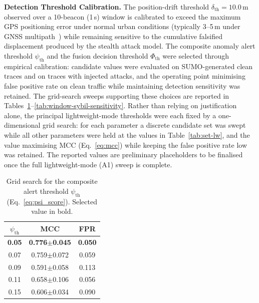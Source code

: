 \documentclass[12pt, a4paper]{report}
\begin{document}
\textbf{Detection Threshold Calibration.}
The position-drift threshold $\delta_{\mathrm{th}} = 10.0$\,m
observed over a 10-beacon (1\,s) window is calibrated to exceed
the maximum GPS positioning error under normal urban conditions
(typically 3--5\,m under GNSS multipath~\cite{kenney2011dedicated})
while remaining sensitive to the cumulative falsified displacement
produced by the stealth attack model. The composite anomaly alert
threshold $\psi_{\mathrm{th}}$ and the fusion decision threshold
$\Phi_{\mathrm{th}}$ were selected through empirical calibration:
candidate values were evaluated on SUMO-generated clean traces and
on traces with injected attacks, and the operating point minimising
false positive rate on clean traffic while maintaining detection
sensitivity was retained. The grid-search sweeps supporting these choices are reported in
Tables~\ref{tab:threshold-sensitivity}--\ref{tab:window-sybil-sensitivity}.
Rather than relying on justification alone, the principal lightweight-mode
thresholds were each fixed by a one-dimensional grid search: for each
parameter a discrete candidate set was swept while all other parameters
were held at the values in Table~\ref{tab:set-lw}, and the value maximising MCC (Eq.~\ref{eq:mcc}) while keeping the false positive rate low was retained. The reported values are preliminary placeholders to be
finalised once the full lightweight-mode (A1) sweep is complete.

\begin{table}[H]
\centering
\caption{Grid search for the composite alert threshold $\psi_{\mathrm{th}}$
(Eq.~\ref{eq:psi_score}). Selected value in bold.}
\label{tab:threshold-sensitivity}
\renewcommand{\arraystretch}{1.2}
\begin{tabular}{|c|c|c|}
\hline
\textbf{$\psi_{\mathrm{th}}$} & \textbf{MCC} & \textbf{FPR} \\
\hline
\textbf{0.05} & \textbf{0.776$\pm$0.045} & \textbf{0.050} \\
\hline
0.07          & 0.759$\pm$0.072 & 0.059 \\
\hline
0.09          & 0.591$\pm$0.058 & 0.113 \\
\hline
0.11          & 0.658$\pm$0.106 & 0.056 \\
\hline
0.15          & 0.606$\pm$0.034 & 0.090 \\
\hline
\end{tabular}
\end{table}
\end{document}
